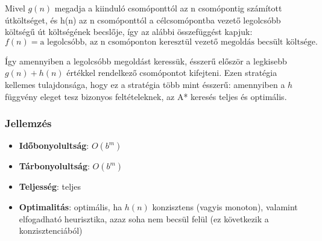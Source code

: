 Mivel $g(n)$ megadja a kiinduló csomóponttól az n csomópontig számított
útköltséget, és h(n) az n csomóponttól a célcsomópontba vezető legolcsóbb
költségű út költségének becslője, így az alábbi összefüggést kapjuk:
\[
    f(n) = \text{a legolcsóbb, az n csomóponton keresztül vezető megoldás
    becsült költsége}
.\]

Így amennyiben a legolcsóbb megoldást keressük, ésszerű először a legkisebb
$g(n) + h(n)$ értékkel rendelkező csomópontot kifejteni. Ezen stratégia
kellemes tulajdonsága, hogy ez a stratégia több mint ésszerű: amennyiben a $h$
függvény eleget tesz bizonyos feltételeknek, az A* keresés teljes és optimális.

\subsubsection{Jellemzés}

\begin{itemize}
    \item {\bf Időbonyolultság}: $O(b^m)$
    \item {\bf Tárbonyolultság}: $O(b^m)$
    \item {\bf Teljesség}: teljes
    \item {\bf Optimalitás}: optimális, ha $h(n)$ konzisztens (vagyis monoton),
        valamint elfogadható heurisztika, azaz soha nem becsül felül (ez
        következik a konzisztenciából)
\end{itemize}
